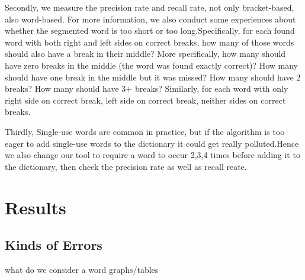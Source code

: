 \documentclass[11pt, oneside, fleqn]{article}
\begin{document}
    Secondly, we measure the precision rate and recall rate, not only bracket-based, also word-based. 
    For more information, we also conduct some experiences about whether the segmented word is too short or too long.Specifically, for each found word with both right and left sides on correct breaks, how many of those words should also have a break in their middle? More specifically, how many should have zero breaks in the middle (the word was found exactly correct)? How many should have one break in the middle but it was missed? How many should have 2 breaks? How many should have 3+ breaks? Similarly, for each word with only right side on correct break, left side on correct break, neither sides on correct breaks. 
   
    Thirdly, Single-use words are common in practice, but if the algorithm is too eager to add single-use words to the dictionary it could get really polluted.Hence we also change our tool to require a word to occur 2,3,4 times before adding it to the dictionary, then check the precision rate as well as recall reate. 
 
   \section*{Results}
   
   \subsection*{Kinds of Errors}

  what do we consider a word
  graphs/tables
 
\end{document}

